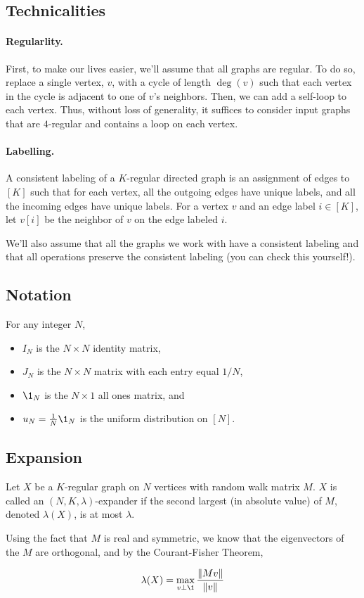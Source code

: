 \documentclass{article}
\begin{document}
\subsection{Technicalities}
\paragraph{Regularlity.} First, to make our lives easier, we'll assume that all graphs are regular. To do so, replace a single vertex, $v$, with a cycle of length $\deg(v)$ such that each vertex in the cycle is adjacent to one of $v$'s neighbors. Then, we can add a self-loop to each vertex. Thus, without loss of generality, it suffices to consider input graphs that are $4$-regular and contains a loop on each vertex.

\paragraph{Labelling.} A consistent labeling of a $K$-regular directed graph is an assignment of edges to $[K]$ such that for each vertex, all the outgoing edges have unique labels, and all the incoming edges have unique labels. For a vertex $v$ and an edge label $i \in [K]$, let $v[i]$ be the neighbor of $v$ on the edge labeled $i$.

We'll also assume that all the graphs we work with have a consistent labeling and that all operations preserve the consistent labeling (you can check this yourself!).

\subsection{Notation}
For any integer $N$,
\begin{itemize}
    \item $I_N$ is the $N \times N$ identity matrix,
    \item $J_N$ is the $N \times N$ matrix with each entry equal $1/N$,
    \item $\1_N$ is the $N \times 1$ all ones matrix, and 
    \item $u_N = \frac{1}{N}\1_N$ is the uniform distribution on $[N]$.
\end{itemize}

\subsection{Expansion}

\begin{definition}[Expander]
    Let $X$ be a $K$-regular graph on $N$ vertices with random walk matrix $M$. $X$ is called an $(N, K, \lambda)$-expander if the second largest (in absolute value) of $M$, denoted $\lambda(X)$, is at most $\lambda$.

    Using the fact that $M$ is real and symmetric, we know that the eigenvectors of the $M$ are orthogonal, and by the Courant-Fisher Theorem, 

    $$
    \lambda(X) = \max_{v \perp \1} \frac{\|Mv\|}{\|v\|}
    $$
\end{definition}
\end{document}

